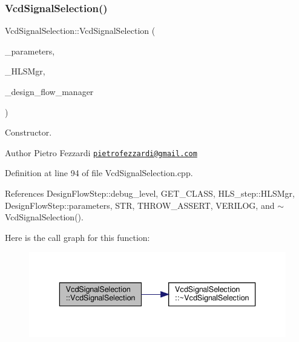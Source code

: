\subsubsection{\texorpdfstring{Vcd\+Signal\+Selection()}{VcdSignalSelection()}}
{\footnotesize\ttfamily Vcd\+Signal\+Selection\+::\+Vcd\+Signal\+Selection (\begin{DoxyParamCaption}\item[{const \hyperlink{Parameter_8hpp_a37841774a6fcb479b597fdf8955eb4ea}{Parameter\+Const\+Ref}}]{\+\_\+parameters,  }\item[{const \hyperlink{hls__manager_8hpp_acd3842b8589fe52c08fc0b2fcc813bfe}{H\+L\+S\+\_\+manager\+Ref}}]{\+\_\+\+H\+L\+S\+Mgr,  }\item[{const Design\+Flow\+Manager\+Const\+Ref}]{\+\_\+design\+\_\+flow\+\_\+manager }\end{DoxyParamCaption})}



Constructor. 

\begin{DoxyAuthor}{Author}
Pietro Fezzardi \href{mailto:pietrofezzardi@gmail.com}{\tt pietrofezzardi@gmail.\+com} 
\end{DoxyAuthor}


Definition at line 94 of file Vcd\+Signal\+Selection.\+cpp.



References Design\+Flow\+Step\+::debug\+\_\+level, G\+E\+T\+\_\+\+C\+L\+A\+SS, H\+L\+S\+\_\+step\+::\+H\+L\+S\+Mgr, Design\+Flow\+Step\+::parameters, S\+TR, T\+H\+R\+O\+W\+\_\+\+A\+S\+S\+E\+RT, V\+E\+R\+I\+L\+OG, and $\sim$\+Vcd\+Signal\+Selection().

Here is the call graph for this function\+:
\nopagebreak
\begin{figure}[H]
\begin{center}
\leavevmode
\includegraphics[width=336pt]{dd/de4/classVcdSignalSelection_ae5930280205726a0f940b7fd2a4801bc_cgraph}
\end{center}
\end{figure}
\mbox{\label{classVcdSignalSelection_af3b73d8ddec404bf3909f58ece570b79}} 
